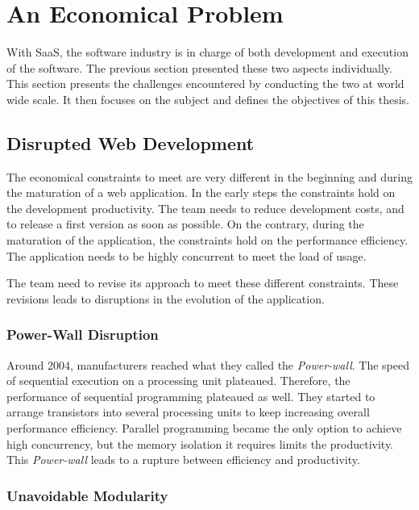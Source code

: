 \section{An Economical Problem} \label{chapter2:problem-statement}

With SaaS, the software industry is in charge of both development and execution of the software.
The previous section presented these two aspects individually.
This section presents the challenges encountered by conducting the two at world wide scale.
It then focuses on the subject and defines the objectives of this thesis.

\subsection{Disrupted Web Development}

The economical constraints to meet are very different in the beginning and during the maturation of a web application.
In the early steps the constraints hold on the development productivity.
The team needs to reduce development costs, and to release a first version as soon as possible.
On the contrary, during the maturation of the application, the constraints hold on the performance efficiency.
The application needs to be highly concurrent to meet the load of usage.

The team need to revise its approach to meet these different constraints.
These revisions leads to disruptions in the evolution of the application.

\subsubsection{Power-Wall Disruption}


Around 2004, manufacturers reached what they called the \textit{Power-wall}.
The speed of sequential execution on a processing unit plateaued.
Therefore, the performance of sequential programming plateaued as well.
They started to arrange transistors into several processing units to keep increasing overall performance efficiency.
Parallel programming became the only option to achieve high concurrency, but the memory isolation it requires limits the productivity.
This \textit{Power-wall} leads to a rupture between efficiency and productivity.

\subsubsection{Unavoidable Modularity}


